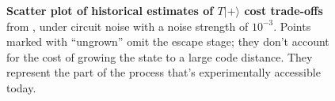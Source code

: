 \documentclass[onecolumn,unpublished,a4paper]{quantumarticle}
\theoremstyle{definition}
\begin{document}
\begin{figure}
    \begin{adjustwidth}{-1cm}{-1cm}
        \centering
    \end{adjustwidth}
    \caption{
        \textbf{Scatter plot of historical estimates of $T|+\rangle$ cost trade-offs} from \cite{fowler2012surfacecodereview,li2015,fowler2018latticesurgery,gidney2019autoccz,litinski2019notascostly,singh2022,gidney2023hook,hirano2024zeroleveldistill,itogawa2024zeroleveldistilldistill,lee2024colordistillation,gidney2024ybasis}, under circuit noise with a noise strength of $10^{-3}$.
        Points marked with ``ungrown'' omit the escape stage; they don't account for the cost of growing the state to a large code distance.
        They represent the part of the process that's experimentally accessible today.
    }
    \label{fig:historical_progression}
\end{figure}
\end{document}

